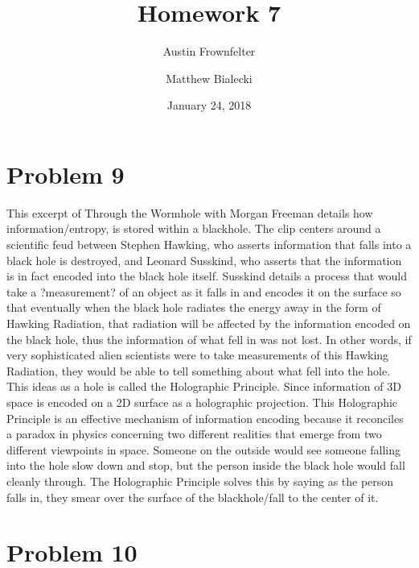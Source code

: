 \documentclass{article}
\title{Homework 7}
\author{Austin Frownfelter \and Matthew Bialecki}
\date{January 24, 2018}
\begin{document}
\maketitle

\section{Problem 9}
This excerpt of Through the Wormhole with Morgan Freeman details how information/entropy, is stored within a blackhole. The clip centers around a scientific feud between Stephen Hawking, who asserts information that falls into a black hole is destroyed, and Leonard Susskind, who asserts that the information is in fact encoded into the black hole itself. Susskind details a process that would take a ?measurement? of an object as it falls in and encodes it on the surface so that eventually when the black hole radiates the energy away in the form of Hawking Radiation, that radiation will be affected by the information encoded on the black hole, thus the information of what fell in was not lost. In other words, if very sophisticated alien scientists were to take measurements of this Hawking Radiation, they would be able to tell something about what fell into the hole. This ideas as a hole is called the Holographic Principle. Since information of 3D space is encoded on a 2D surface as a holographic projection. This Holographic Principle is an effective mechanism of information encoding because it reconciles a paradox in physics concerning two different realities that emerge from two different viewpoints in space. Someone on the outside would see someone falling into the hole slow down and stop, but the person inside the black hole would fall cleanly through. The Holographic Principle solves this by saying as the person falls in, they smear over the surface of the blackhole/fall to the center of it. 
\section{Problem 10}
\end{document}
